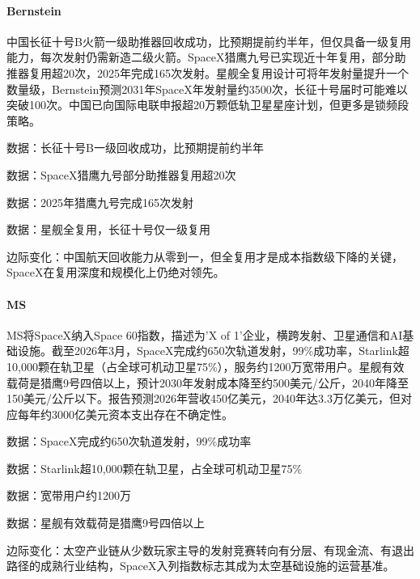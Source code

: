 \documentclass[11pt]{ctexart}
\begin{document}
\paragraph{Bernstein} 中国长征十号B火箭一级助推器回收成功，比预期提前约半年，但仅具备一级复用能力，每次发射仍需新造二级火箭。SpaceX猎鹰九号已实现近十年复用，部分助推器复用超20次，2025年完成165次发射。星舰全复用设计可将年发射量提升一个数量级，Bernstein预测2031年SpaceX年发射量约3500次，长征十号届时可能难以突破100次。中国已向国际电联申报超20万颗低轨卫星星座计划，但更多是锁频段策略。
{\small\color{refgray}数据：长征十号B一级回收成功，比预期提前约半年\par}
{\small\color{refgray}数据：SpaceX猎鹰九号部分助推器复用超20次\par}
{\small\color{refgray}数据：2025年猎鹰九号完成165次发射\par}
{\small\color{refgray}数据：星舰全复用，长征十号仅一级复用\par}
{\small\color{refgray}边际变化：中国航天回收能力从零到一，但全复用才是成本指数级下降的关键，SpaceX在复用深度和规模化上仍绝对领先。\par}
\paragraph{MS} MS将SpaceX纳入Space 60指数，描述为'X of 1'企业，横跨发射、卫星通信和AI基础设施。截至2026年3月，SpaceX完成约650次轨道发射，99\%成功率，Starlink超10,000颗在轨卫星（占全球可机动卫星75\%），服务约1200万宽带用户。星舰有效载荷是猎鹰9号四倍以上，预计2030年发射成本降至约500美元/公斤，2040年降至150美元/公斤以下。报告预测2026年营收450亿美元，2040年达3.3万亿美元，但对应每年约3000亿美元资本支出存在不确定性。
{\small\color{refgray}数据：SpaceX完成约650次轨道发射，99\%成功率\par}
{\small\color{refgray}数据：Starlink超10,000颗在轨卫星，占全球可机动卫星75\%\par}
{\small\color{refgray}数据：宽带用户约1200万\par}
{\small\color{refgray}数据：星舰有效载荷是猎鹰9号四倍以上\par}
{\small\color{refgray}边际变化：太空产业链从少数玩家主导的发射竞赛转向有分层、有现金流、有退出路径的成熟行业结构，SpaceX入列指数标志其成为太空基础设施的运营基准。\par}
\end{document}
